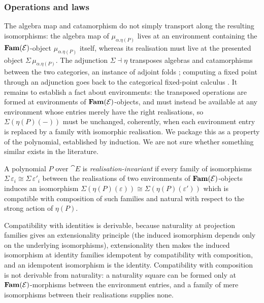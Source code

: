 \subsubsection{Operations and laws}
The algebra map and catamorphism do not simply transport along the resulting isomorphisms: the algebra map of
$\mu_{\alpha.\eta(P)}$ lives at an environment containing the $\mathbf{Fam}(\mathcal{E})$-object
$\mu_{\alpha.\eta(P)}$ itself, whereas its realisation must live at the presented object
$\Sigma\, \mu_{\alpha.\eta(P)}$. The adjunction $\Sigma \dashv \eta$ transposes algebras and
catamorphisms between the two categories, an instance of adjoint folds \citep{hinze13};
computing a fixed point through an adjunction goes back to the categorical fixed-point calculus
\citep{backhouse95}. It remains to establish a fact about environments: the transposed operations are formed at
environments of $\mathbf{Fam}(\mathcal{E})$-objects, and must instead be available at any environment
whose entries merely have the right realisations, so $\Sigma(\eta(P)(-))$ must be unchanged,
coherently, when each environment entry is replaced by a family with isomorphic realisation. We
package this as a property of the polynomial, established by induction. We are not sure whether something similar exists in the literature.

\begin{definition}
\label{def:conservativity:realisation-invariance}
A polynomial $P$ over $\cat{E}$ is \emph{realisation-invariant} if every family of isomorphisms
$\Sigma\,\varepsilon_i \cong \Sigma\,\varepsilon'_i$ between the realisations of two
environments of $\mathbf{Fam}(\mathcal{E})$-objects induces an isomorphism $\Sigma(\eta(P)(\varepsilon))
\cong \Sigma(\eta(P)(\varepsilon'))$ which is compatible with composition of such families and
natural with respect to the strong action of $\eta(P)$.
\end{definition}

\begin{remark}
Compatibility with identities is derivable, because naturality at projection families
gives an extensionality principle (the induced isomorphism depends only on the underlying
isomorphisms), extensionality then makes the induced isomorphism at identity families idempotent
by compatibility with composition, and an idempotent isomorphism is the
identity. Compatibility with composition is not derivable from
naturality: a naturality square can be formed only at $\mathbf{Fam}(\mathcal{E})$-morphisms
between the environment entries, and a family of mere isomorphisms between their realisations
supplies none.
\end{remark}


